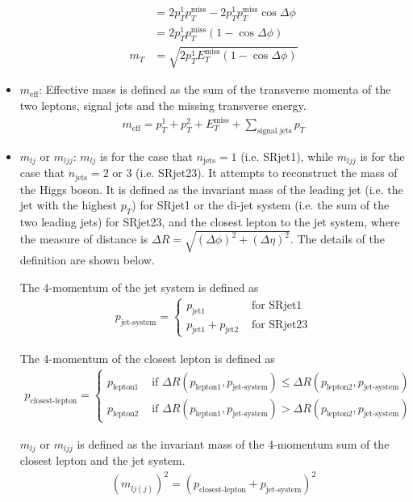 \begin{itemize}
\begin{align}
&= 2 p_T^1 p_T^{\text{miss}} - 2 p_T^1 p_T^{\text{miss}} \cos{\Delta\phi} \\
&= 2 p_T^1 p_T^{\text{miss}} ( 1 - \cos{\Delta\phi} ) \\
m_T &= \sqrt{ 2 p_T^1 E_T^{\text{miss}} ( 1 - \cos{\Delta\phi} ) } \label{equ:mT_approx}
\end{align}
\item $m_{\text{eff}}$:
Effective mass is defined as the sum of the transverse momenta of the two leptons, signal jets and the missing transverse energy.
\begin{align}
m_{\text{eff}} = p_T^1 + p_T^2 + E_T^{\text{miss}} + \sum_{\text {signal jets}} p_T
\end{align}
\item $m_{lj}$ or $m_{ljj}$:
$m_{lj}$ is for the case that $n_{\text{jets}} = 1$ (i.e. SRjet1), while $m_{ljj}$ is for the case that $n_{\text{jets}} = 2$ or $3$ (i.e. SRjet23).
It attempts to reconstruct the mass of the Higgs boson.
It is defined as the invariant mass of the leading jet (i.e. the jet with the highest $p_T$) for SRjet1 or the di-jet system (i.e. the sum of the two leading jets) for SRjet23, and the closest lepton to the jet system, where the measure of distance is $\Delta R = \sqrt{(\Delta\phi)^2 + (\Delta\eta)^2}$.
The details of the definition are shown below.

The 4-momentum of the jet system is defined as
\begin{align}
p_{\text{jet-system}} =
\left\{
\begin{array}{ll}
p_{\text{jet1}} &\text{ for SRjet1}\\
p_{\text{jet1}} + p_{\text{jet2}} &\text{ for SRjet23}
\end{array} \right.
\end{align}

The 4-momentum of the closest lepton is defined as
\begin{align}
p_{\text{closest-lepton}} =
\left\{
\begin{array}{ll}
p_{\text{lepton1}} &\text{ if } \Delta R(p_{\text{lepton1}},p_{\text{jet-system}}) \leq \Delta R(p_{\text{lepton2}},p_{\text{jet-system}}) \\
p_{\text{lepton2}} &\text{ if } \Delta R(p_{\text{lepton1}},p_{\text{jet-system}}) > \Delta R(p_{\text{lepton2}},p_{\text{jet-system}})
\end{array} \right.
\end{align}

$m_{lj}$ or $m_{ljj}$ is defined as the invariant mass of the 4-momentum sum of the closest lepton and the jet system.
\begin{align}
(m_{lj(j)})^2 = (p_{\text{closest-lepton}} + p_{\text{jet-system}})^2
\end{align}


\end{itemize}
